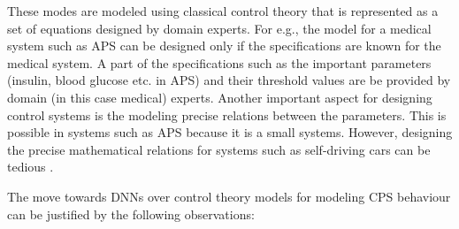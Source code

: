 These modes are modeled using classical control theory that is represented as a set of equations designed by domain experts.
 For e.g., the model for a medical system such as \ac{APS} can be designed only if the specifications are known for the medical system. 
 A part of the specifications such as the important parameters (insulin, blood glucose etc. in APS) and their threshold values are be provided by domain (in this case medical) experts. 
 Another important aspect for designing control systems is the  modeling precise relations between the parameters. 
 This is possible in systems such as APS because it is a small systems. However, designing the precise mathematical relations for systems such as self-driving cars can be tedious \cite{article23}. 

 The move towards DNNs over control theory models for modeling \ac{CPS} behaviour can be justified by the following observations:
